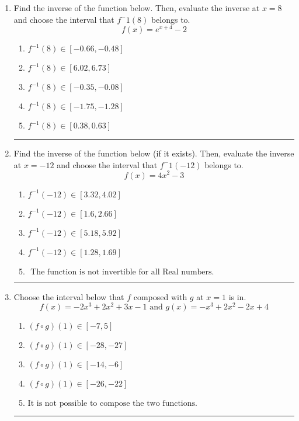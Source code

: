 \documentclass[14pt]{extbook}
\newcommand{\litem}[1]{\item#1\hspace*{-1cm}\rule{\textwidth}{0.4pt}}
\begin{document}
\begin{enumerate}
{\begin{enumerate}[label=\Alph*.]
\end{enumerate} }
\litem{
Find the inverse of the function below. Then, evaluate the inverse at $x = 8$ and choose the interval that $f^-1(8)$ belongs to.\[ f(x) = e^{x+4}-2 \]\begin{enumerate}[label=\Alph*.]
\item \( f^{-1}(8) \in [-0.66, -0.48] \)
\item \( f^{-1}(8) \in [6.02, 6.73] \)
\item \( f^{-1}(8) \in [-0.35, -0.08] \)
\item \( f^{-1}(8) \in [-1.75, -1.28] \)
\item \( f^{-1}(8) \in [0.38, 0.63] \)

\end{enumerate} }
\litem{
Find the inverse of the function below (if it exists). Then, evaluate the inverse at $x = -12$ and choose the interval that $f^-1(-12)$ belongs to.\[ f(x) = 4 x^2 - 3 \]\begin{enumerate}[label=\Alph*.]
\item \( f^{-1}(-12) \in [3.32, 4.02] \)
\item \( f^{-1}(-12) \in [1.6, 2.66] \)
\item \( f^{-1}(-12) \in [5.18, 5.92] \)
\item \( f^{-1}(-12) \in [1.28, 1.69] \)
\item \( \text{ The function is not invertible for all Real numbers. } \)

\end{enumerate} }
\litem{
Choose the interval below that $f$ composed with $g$ at $x=1$ is in.\[ f(x) = -2x^{3} +2 x^{2} +3 x -1 \text{ and } g(x) = -x^{3} +2 x^{2} -2 x + 4 \]\begin{enumerate}[label=\Alph*.]
\item \( (f \circ g)(1) \in [-7, 5] \)
\item \( (f \circ g)(1) \in [-28, -27] \)
\item \( (f \circ g)(1) \in [-14, -6] \)
\item \( (f \circ g)(1) \in [-26, -22] \)
\item \( \text{It is not possible to compose the two functions.} \)


\end{enumerate}}
\end{enumerate}
\end{document}
